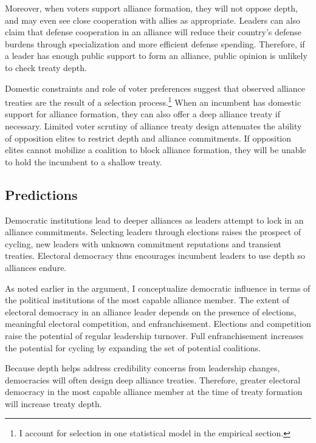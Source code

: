 \documentclass[12pt]{article}
\begin{document}
Moreover, when voters support alliance formation, they will not oppose depth, and may even see close cooperation with allies as appropriate. 
Leaders can also claim that defense cooperation in an alliance will reduce their country's defense burdens through specialization and more efficient defense spending.  
Therefore, if a leader has enough public support to form an alliance, public opinion is unlikely to check treaty depth. 


Domestic constraints and role of voter preferences suggest that observed alliance treaties are the result of a selection process.\footnote{I account for selection in one statistical model in the empirical section.} 
When an incumbent has domestic support for alliance formation, they can also offer a deep alliance treaty if necessary. 
Limited voter scrutiny of alliance treaty design attenuates the ability of opposition elites to restrict depth and alliance commitments.
If opposition elites cannot mobilize a coalition to block alliance formation, they will be unable to hold the incumbent to a shallow treaty. 



\subsection{Predictions}


Democratic institutions lead to deeper alliances as leaders attempt to lock in an alliance commitments. 
Selecting leaders through elections raises the prospect of cycling, new leaders with unknown commitment reputations and transient treaties. 
Electoral democracy thus encourages incumbent leaders to use depth so alliances endure.


As noted earlier in the argument, I conceptualize democratic influence in terms of the political institutions of the most capable alliance member.
The extent of electoral democracy in an alliance leader depends on the presence of elections, meaningful electoral competition, and enfranchisement. 
Elections and competition raise the potential of regular leadership turnover. 
Full enfranchisement increases the potential for cycling by expanding the set of potential coalitions. 


Because depth helps address credibility concerns from leadership changes, democracies will often design deep alliance treaties. 
Therefore, greater electoral democracy in the most capable alliance member at the time of treaty formation will increase treaty depth. 
\end{document}

